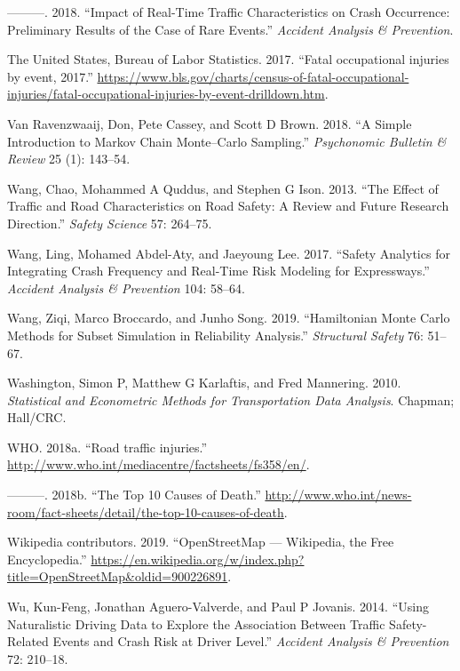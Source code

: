 \documentclass[12pt]{book}
\numberwithin{equation}{chapter}
\begin{document}
\leavevmode\hypertarget{ref-theofilatos2018impact}{}%
---------. 2018. ``Impact of Real-Time Traffic Characteristics on Crash Occurrence: Preliminary Results of the Case of Rare Events.'' \emph{Accident Analysis \& Prevention}.

\leavevmode\hypertarget{ref-bols}{}%
The United States, Bureau of Labor Statistics. 2017. ``Fatal occupational injuries by event, 2017.'' \url{https://www.bls.gov/charts/census-of-fatal-occupational-injuries/fatal-occupational-injuries-by-event-drilldown.htm}.

\leavevmode\hypertarget{ref-van2018simple}{}%
Van Ravenzwaaij, Don, Pete Cassey, and Scott D Brown. 2018. ``A Simple Introduction to Markov Chain Monte--Carlo Sampling.'' \emph{Psychonomic Bulletin \& Review} 25 (1): 143--54.

\leavevmode\hypertarget{ref-wang2013effect}{}%
Wang, Chao, Mohammed A Quddus, and Stephen G Ison. 2013. ``The Effect of Traffic and Road Characteristics on Road Safety: A Review and Future Research Direction.'' \emph{Safety Science} 57: 264--75.

\leavevmode\hypertarget{ref-wang2017safety}{}%
Wang, Ling, Mohamed Abdel-Aty, and Jaeyoung Lee. 2017. ``Safety Analytics for Integrating Crash Frequency and Real-Time Risk Modeling for Expressways.'' \emph{Accident Analysis \& Prevention} 104: 58--64.

\leavevmode\hypertarget{ref-wang2019hamiltonian}{}%
Wang, Ziqi, Marco Broccardo, and Junho Song. 2019. ``Hamiltonian Monte Carlo Methods for Subset Simulation in Reliability Analysis.'' \emph{Structural Safety} 76: 51--67.

\leavevmode\hypertarget{ref-washington2010statistical}{}%
Washington, Simon P, Matthew G Karlaftis, and Fred Mannering. 2010. \emph{Statistical and Econometric Methods for Transportation Data Analysis}. Chapman; Hall/CRC.

\leavevmode\hypertarget{ref-who2018b}{}%
WHO. 2018a. ``Road traffic injuries.'' \url{http://www.who.int/mediacentre/factsheets/fs358/en/}.

\leavevmode\hypertarget{ref-who2018}{}%
---------. 2018b. ``The Top 10 Causes of Death.'' \url{http://www.who.int/news-room/fact-sheets/detail/the-top-10-causes-of-death}.

\leavevmode\hypertarget{ref-wikiOSM}{}%
Wikipedia contributors. 2019. ``OpenStreetMap --- Wikipedia, the Free Encyclopedia.'' \url{https://en.wikipedia.org/w/index.php?title=OpenStreetMap\&oldid=900226891}.

\leavevmode\hypertarget{ref-wu2014using}{}%
Wu, Kun-Feng, Jonathan Aguero-Valverde, and Paul P Jovanis. 2014. ``Using Naturalistic Driving Data to Explore the Association Between Traffic Safety-Related Events and Crash Risk at Driver Level.'' \emph{Accident Analysis \& Prevention} 72: 210--18.
\end{document}
